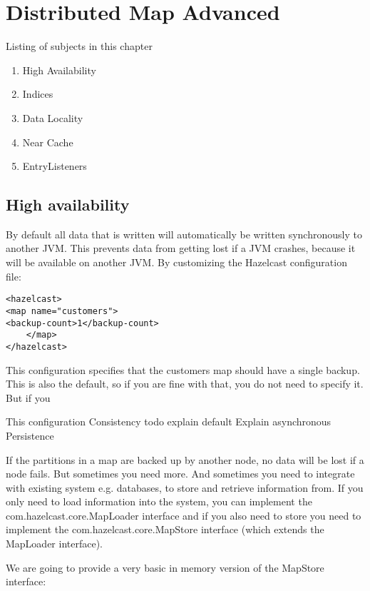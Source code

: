 \chapter{Distributed Map Advanced}

Listing of subjects in this chapter
\begin{enumerate}
\item High Availability
\item Indices
\item Data Locality
\item Near Cache

\item EntryListeners
\end{enumerate}

\section{High availability}

By default all data that is written will automatically be written synchronously to another JVM. This prevents data from getting lost if a JVM crashes, because it will be available on another JVM. By customizing the Hazelcast configuration file:
\begin{verbatim}
<hazelcast> 
<map name="customers"> 
<backup-count>1</backup-count>
 	</map> 
</hazelcast>
\end{verbatim}

This configuration specifies that the customers map should have a single backup. This is also the default, so if you are fine with that, you do not need to specify it. But if you 

This configuration 
Consistency
todo explain default
Explain asynchronous
Persistence

If the partitions in a map are backed up by another node, no data will be lost if a node fails. But sometimes you need more. And sometimes you need to integrate with existing system e.g. databases, to store and retrieve information from. If you only need to load information into the system, you can implement the com.hazelcast.core.MapLoader interface and if you also need to store you need to implement the com.hazelcast.core.MapStore interface (which extends the MapLoader interface).

We are going to provide a very basic in memory version of the MapStore interface:

